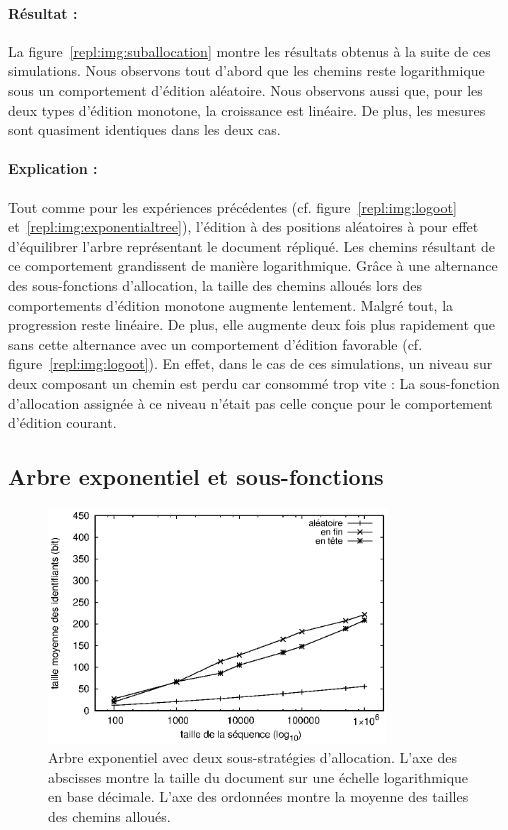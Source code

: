 \paragraph{Résultat :} La figure~\ref{repl:img:suballocation} montre les
résultats obtenus à la suite de ces simulations. Nous observons tout d'abord que
les chemins reste logarithmique sous un comportement d'édition aléatoire. Nous
observons aussi que, pour les deux types d'édition monotone, la croissance est
linéaire. De plus, les mesures sont quasiment identiques dans les deux cas.

\paragraph{Explication :} Tout comme pour les expériences précédentes
(cf. figure~\ref{repl:img:logoot} et~\ref{repl:img:exponentialtree}), l'édition
à des positions aléatoires à pour effet d'équilibrer l'arbre représentant le
document répliqué. Les chemins résultant de ce comportement grandissent de
manière logarithmique. Grâce à une alternance des sous-fonctions d'allocation,
la taille des chemins alloués lors des comportements d'édition monotone augmente
lentement. Malgré tout, la progression reste linéaire. De plus, elle augmente
deux fois plus rapidement que sans cette alternance avec un comportement
d'édition favorable (cf. figure~\ref{repl:img:logoot}). En effet, dans le cas de
ces simulations, un niveau sur deux composant un chemin est perdu car consommé
trop vite : La sous-fonction d'allocation assignée à ce niveau n'était pas celle
conçue pour le comportement d'édition courant.


\subsection{Arbre exponentiel et sous-fonctions}

\begin{figure}
  \begin{center}
    \includegraphics[width=0.8\textwidth]{img/lseq/lseq.eps}
    \caption[Combinaison de l'arbre exponentiel et des sous-fonctions
    d'allocation] {\label{repl:img:lseq} Arbre exponentiel avec deux
      sous-stratégies d'allocation. L'axe des abscisses montre la taille du
      document sur une échelle logarithmique en base décimale. L'axe des
      ordonnées montre la moyenne des tailles des chemins alloués.}
  \end{center}
\end{figure}

